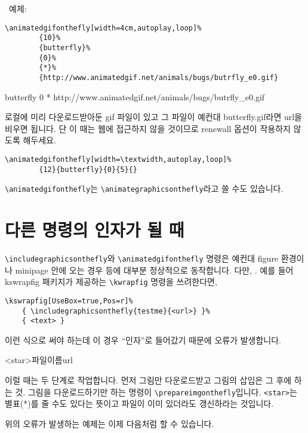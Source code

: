 \documentclass[b5paper,nanum]{oblivoir}
\def\cs#1{\texttt{\textbackslash #1}}
\begin{document}
\bigskip

\noindent\textbullet\ 예제:
\begin{verbatim}
\animatedgifonthefly[width=4cm,autoplay,loop]%
        {10}%
        {butterfly}%
        {0}%
        {*}%
        {http://www.animatedgif.net/animals/bugs/butrfly_e0.gif}
\end{verbatim}
%
        {butterfly}%
        {0}%
        {*}%
        {http://www.animatedgif.net/animals/bugs/butrfly_e0.gif}

\bigskip

로컬에 미리 다운로드받아둔 gif 파일이 있고 그 파일이 예컨대 butterfly.gif라면 url을 비우면 됩니다. 단 이 때는 웹에 접근하지 않을 것이므로 renewall 옵션이 작용하지 않도록 해두세요.
\begin{verbatim}
\animatedgifonthefly[width=\textwidth,autoplay,loop]%
        {12}{butterfly}{0}{5}{}
\end{verbatim}

\medskip

\cs{animatedgifonthefly}는 \cs{animategraphicsonthefly}라고 쓸 수도 있습니다.

\section{다른 명령의 인자가 될 때}

\marginpar{[v0.9]}
\cs{includegraphicsonthefly}와 \cs{animatedgifonthefly} 명령은 예컨대 figure 환경이나
minipage 안에 오는 경우 등에 대부분 정상적으로 동작합니다. 다만, .
예를 들어 kswrapfig 패키지가 제공하는 \cs{kwrapfig} 명령을 쓰려한다면,
\begin{verbatim}
\kswrapfig[UseBox=true,Pos=r]%
	{ \includegraphicsonthefly{testme}{<url>} }%
	{ <text> }
\end{verbatim}
이런 식으로 써야 하는데 이 경우 ``인자''로 들어갔기 때문에 오류가 발생합니다.

\begin{boxedverbatim}
\prepareimgonthefly<star>{파일이름}{url}
\end{boxedverbatim}
이럴 때는 두 단계로 작업합니다. 먼저 그림만 다운로드받고 그림의 삽입은 그 후에 하는 것. 그림을 다운로드하기만 하는 명령이 \cs{prepareimgonthefly}입니다. \verb|<star>|는 별표(*)를 줄 수도 있다는 뜻이고 파일이 이미 있더라도 갱신하라는 것입니다.

위의 오류가 발생하는 예제는 이제 다음처럼 할 수 있습니다.
\end{document}
